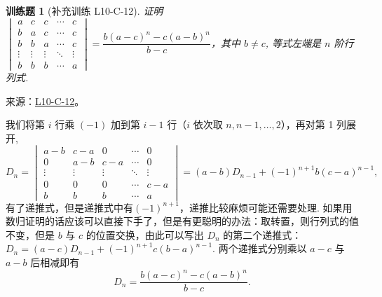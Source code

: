 \documentclass[12pt,fontset=fandol]{ctexart}
\newtheorem{exercise}{训练题}[section]
\begin{document}
\begin{exercise}[补充训练 L10-C-12]\label{prob:L10-C-12}
证明$\begin{vmatrix}
                a      & c      & c      & \cdots & c      \\
                b      & a      & c      & \cdots & c      \\
                b      & b      & a      & \cdots & c      \\
                \vdots & \vdots & \vdots & \ddots & \vdots \\
                b      & b      & b      & \cdots & a
            \end{vmatrix}=\dfrac{b(a-c)^{n}-c(a-b)^{n}}{b-c}$，其中 $b \neq c$, 等式左端是 $n$ 阶行列式.
\end{exercise}
\noindent 来源：\href{https://github.com/yhwu-is/Linear-Algebra-Left-Undone/blob/new/%E8%AE%B2%E4%B9%89/%E4%B8%93%E9%A2%98/10%20%E8%A1%8C%E5%88%97%E5%BC%8F.tex}{L10-C-12}。
\begin{solve}
我们将第 $i$ 行乘 $(-1)$ 加到第 $i-1$ 行（$i$ 依次取 $n, n-1, \ldots, 2$），再对第 1 列展开,
            \[D_{n}=\begin{vmatrix}
                    a-b    & c-a    & 0      & \cdots & 0      \\
                    0      & a-b    & c-a    & \cdots & 0      \\
                    \vdots & \vdots & \vdots & \ddots & \vdots \\
                    0      & 0      & 0      & \cdots & c-a    \\
                    b      & b      & b      & \cdots & a
                \end{vmatrix}=(a-b)D_{n-1}+(-1)^{n+1}b(c-a)^{n-1},\]
            有了递推式，但是递推式中有$(-1)^{n+1}$，递推比较麻烦可能还需要处理. 如果用数归证明的话应该可以直接下手了，但是有更聪明的办法：取转置，则行列式的值不变，但是 $b$ 与 $c$ 的位置交换，由此可以写出 $D_n$ 的第二个递推式：$D_n=(a-c)D_{n-1}+(-1)^{n+1}c(b-a)^{n-1}$. 两个递推式分别乘以 $a-c$ 与 $a-b$ 后相减即有
            \[
                D_n=\dfrac{b(a-c)^{n}-c(a-b)^{n}}{b-c}.
            \]
\end{solve}
\end{document}
